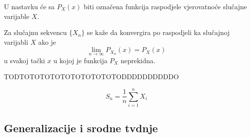 U nastavku će sa $P_X(x)$ biti označena funkcija raspodjele
vjerovatnoće slučajne varijable $X$.
\begin{definition}
  Za slučajnu sekvencu $\{X_n\}$ se kaže da konvergira po raspodjeli ka
  slučajnoj varijabli $X$ ako je
  \begin{equation}
    \lim_{n\to\infty} P_{X_n}(x) = P_X(x)
  \end{equation}
  u svakoj tački $x$ u kojoj je funkcija $P_X$ neprekidna.
\end{definition}

TODTOTOTOTOTOTOTOTOTOTODDDDDDDDDDO

\begin{equation} \label{eq:sample-mean}
  S_n = \frac{1}{n} \sum_{i=1}^{n} X_i
\end{equation}

\subsection{Generalizacije i srodne tvdnje}

